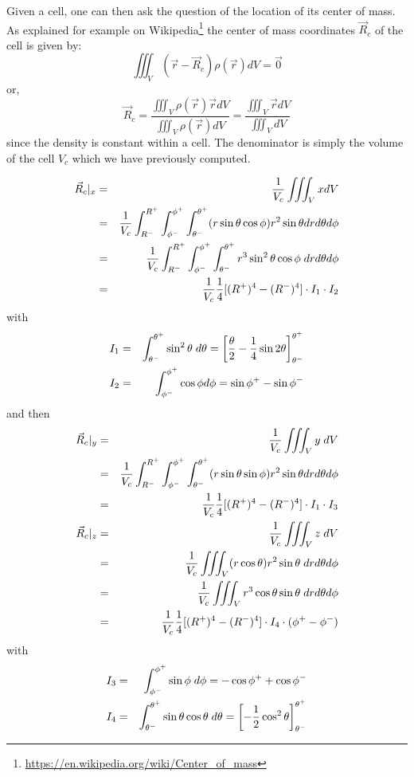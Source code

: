 Given a cell, one can then ask the question of the location of its center of mass.
As explained for example on Wikipedia\footnote{\url{https://en.wikipedia.org/wiki/Center_of_mass}}
the center of mass coordinates $\vec{R}_c$ of the cell is given by:
\[
\iiint_V (\vec{r}-\vec{R}_c) \rho(\vec{r}) dV = \vec{0}
\]
or, 
\[
\vec{R}_c = \frac{\iiint_V \rho(\vec{r}) \vec{r} dV}{\iiint_V \rho(\vec{r}) dV}
= \frac{\iiint_V \vec{r} dV}{\iiint_V dV}
\]
since the density is constant within a cell. 
The denominator is simply the volume of the cell $V_c$ which we have previously computed.

\begin{eqnarray}
\vec{R}_c|_x
&=&\frac{1}{V_c}
\iiint_V x dV \nonumber\\
&=& \frac{1}{V_c}
\int_{R^-}^{R^+} \int_{\phi^-}^{\phi^+} \int_{\theta^-}^{\theta^+} 
(r \sin\theta \cos\phi) 
r^2 \sin \theta dr d\theta d\phi \nonumber\\
&=&\frac{1}{V_c}
 \int_{R^-}^{R^+} \int_{\phi^-}^{\phi^+} \int_{\theta^-}^{\theta^+} 
r^3 \sin^2 \theta  \cos \phi \; dr d\theta d\phi \nonumber\\
&=&\frac{1}{V_c}
 \frac{1}{4}[(R^+)^4-(R^-)^4] \cdot I_1 \cdot I_2 
\end{eqnarray}
with
\begin{eqnarray}
I_1&=&\int_{\theta^-}^{\theta^+}  \sin^2 \theta \; d\theta 
= \left[ \frac{\theta}{2} -\frac{1}{4}\sin 2\theta \right]_{\theta^-}^{\theta^+} \nonumber\\
I_2&=&\int_{\phi^-}^{\phi^+}  \cos \phi d\phi = \sin \phi^+ - \sin \phi^- \nonumber
\end{eqnarray}
and then 
\begin{eqnarray}
\vec{R}_c|_y
&=&
\frac{1}{V_c}
\iiint_V y \; dV \nonumber\\
&=& \frac{1}{V_c}
\int_{R^-}^{R^+} \int_{\phi^-}^{\phi^+} \int_{\theta^-}^{\theta^+} 
(r \sin\theta \sin\phi) 
r^2 \sin \theta dr d\theta d\phi \nonumber\\
&=&\frac{1}{V_c}
 \frac{1}{4}[(R^+)^4-(R^-)^4] \cdot I_1 \cdot I_3 \nonumber\\ 
\vec{R}_c|_z
&=&\frac{1}{V_c}
\iiint_V z \; dV \nonumber\\
&=&\frac{1}{V_c}
\iiint_V (r \cos \theta) r^2 \sin \theta \; dr d\theta d\phi  \nonumber\\
&=&\frac{1}{V_c}
\iiint_V r^3 \cos \theta \sin \theta \; dr d\theta d\phi  \nonumber\\
&=& \frac{1}{V_c}
\frac{1}{4}[(R^+)^4-(R^-)^4] \cdot I_4 \cdot (\phi^+-\phi^-)
\end{eqnarray}
with
\begin{eqnarray}
I_3&=&\int_{\phi^-}^{\phi^+}  \sin \phi \; d\phi = -\cos \phi^+ + \cos \phi^- \nonumber\\
I_4&=&\int_{\theta^-}^{\theta^+}  \sin \theta \cos\theta \; d\theta 
= \left[-\frac{1}{2}\cos^2 \theta \right]_{\theta^-}^{\theta^+}  \nonumber
\end{eqnarray}

